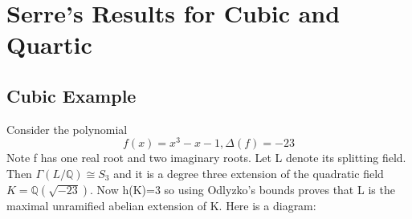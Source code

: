 \documentclass[preprint,12pt,reqno]{elsarticle}
\begin{document}
\section{Serre's Results for Cubic and Quartic}
\subsection{Cubic Example}
Consider the polynomial \begin{equation}
 f(x)=x^3-x-1, \Delta(f)=-23
\end{equation}
Note f has one real root and two imaginary roots. Let L denote its splitting field. Then $\Gamma(L/\mathbb{Q})\cong S_3$ and it is a degree three extension of the quadratic field $K= \mathbb{Q}(\sqrt{-23})$. Now h(K)=3 so using Odlyzko's bounds proves that L is the maximal unramified abelian extension of K. Here is a diagram:
\begin{center}
\end{center}
\end{document}
